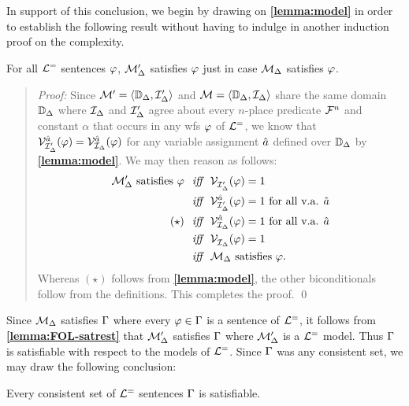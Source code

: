 In support of this conclusion, we begin by drawing on \textbf{\ref{lemma:model}} in order to establish the following result without having to indulge in another induction proof on the complexity.

\begin{Lthm} \label{lemma:FOL-satrest}
  For all $\mathcal{L}^{=}$ sentences $\varphi$, $\mathcal{M}'_{\Delta}$ satisfies $\varphi$ just in case $\mathcal{M}_{\Delta}$ satisfies $\varphi$.
\end{Lthm}

\begin{quote} 
  \textit{Proof:}
  Since $\mathcal{M}'=\langle\mathbb{D}_{\Delta},\mathcal{I}_{\Delta}'\rangle$ and $\mathcal{M}=\langle\mathbb{D}_{\Delta},\mathcal{I}_{\Delta}\rangle$ share the same domain $\mathbb{D}_{\Delta}$ where $\mathcal{I}_{\Delta}$ and $\mathcal{I}'_{\Delta}$ agree about every $n$-place predicate $\mathcal{F}^n$ and constant $\alpha$ that occurs in any wfs $\varphi$ of $\mathcal{L}^{=}$, we know that $\mathcal{V}_{\mathcal{I}'_{\Delta}}^{\hat{a}}(\varphi) = \mathcal{V}_{\mathcal{I}_{\Delta}}^{\hat{a}}(\varphi)$ for any variable assignment $\hat{a}$ defined over $\mathbb{D}_{\Delta}$ by \textbf{\ref{lemma:model}}.
  We may then reason as follows:
  \begin{align*}
    \mathcal{M}'_{\Delta} \text{ satisfies } \varphi &\textit{ ~iff~ } \mathcal{V}_{\mathcal{I}'_{\Delta}}^{}(\varphi)=1\\
    &\textit{ ~iff~ } \mathcal{V}_{\mathcal{I}'_{\Delta}}^{\hat{a}}(\varphi)=1 \text{ for all v.a. } \hat{a}\\
    (\star) &\textit{ ~iff~ } \mathcal{V}_{\mathcal{I}_{\Delta}}^{\hat{a}}(\varphi)=1 \text{ for all v.a. } \hat{a}\\
    &\textit{ ~iff~ } \mathcal{V}_{\mathcal{I}_{\Delta}}^{}(\varphi)=1\\
    &\textit{ ~iff~ } \mathcal{M}_{\Delta} \text{ satisfies } \varphi.
  \end{align*}
  Whereas $(\star)$ follows from \textbf{\ref{lemma:model}}, the other biconditionals follow from the definitions.
  This completes the proof.
  \qed
\end{quote}

Since $\mathcal{M}_{\Delta}$ satisfies $\Gamma$ where every $\varphi\in\Gamma$ is a sentence of $\mathcal{L}^{=}$, it follows from \textbf{\ref{lemma:FOL-satrest}} that $\mathcal{M}'_{\Delta}$ satisfies $\Gamma$ where $\mathcal{M}'_{\Delta}$ is a $\mathcal{L}^{=}$ model. 
Thus $\Gamma$ is satisfiable with respect to the models of $\mathcal{L}^{=}$.
Since $\Gamma$ was any consistent set, we may draw the following conclusion:

  \begin{Tthm} \label{thm:FOL-conscomp}
    Every consistent set of $\mathcal{L}^{=}$ sentences $\Gamma$ is satisfiable. 
  \end{Tthm}

